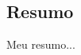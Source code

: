 
\begin{otherlanguage}{portuguese}





\chapter*{Resumo}
\thispagestyle{empty}

Meu resumo...

\begin{flushleft}
\end{flushleft}

\end{otherlanguage}
